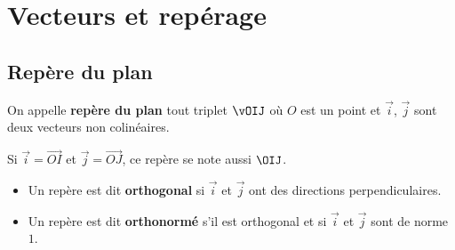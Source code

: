 \chapter{Vecteurs et repérage}

\section{Repère du plan}

\begin{defin}
	On appelle \textbf{repère du plan} tout triplet $\vOIJ$ où $O$ est un point et $\vec{i}$, $\vec{j}$ sont deux vecteurs non colinéaires.

	Si $\vec{i} = \vec{OI}$ et $\vec{j} = \vec{OJ}$, ce repère se note aussi $\OIJ$.

	\begin{itemize}
		\item Un repère est dit \textbf{orthogonal} si $\vec{i}$ et $\vec{j}$ ont des directions perpendiculaires.
		\item Un repère est dit \textbf{orthonormé} s'il est orthogonal et si $\vec{i}$ et $\vec{j}$ sont de norme $1$.
	\end{itemize}


\end{defin}
